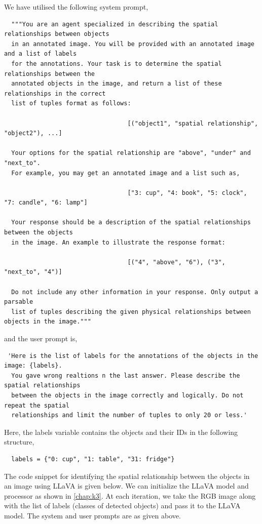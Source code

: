We have utilised the following system prompt, 
\begin{lstlisting}
  """You are an agent specialized in describing the spatial relationships between objects 
  in an annotated image. You will be provided with an annotated image and a list of labels
  for the annotations. Your task is to determine the spatial relationships between the 
  annotated objects in the image, and return a list of these relationships in the correct 
  list of tuples format as follows: 

                                  [("object1", "spatial relationship", "object2"), ...] 

  Your options for the spatial relationship are "above", "under" and "next_to". 
  For example, you may get an annotated image and a list such as, 

                                  ["3: cup", "4: book", "5: clock", "7: candle", "6: lamp"]

  Your response should be a description of the spatial relationships between the objects
  in the image. An example to illustrate the response format: 

                                  [("4", "above", "6"), ("3", "next_to", "4")]

  Do not include any other information in your response. Only output a parsable 
  list of tuples describing the given physical relationships between objects in the image."""
\end{lstlisting}
 and the user prompt is, 
 \begin{lstlisting}
 'Here is the list of labels for the annotations of the objects in the image: {labels}. 
  You gave wrong realtions n the last answer. Please describe the spatial relationships 
  between the objects in the image correctly and logically. Do not repeat the spatial 
  relationships and limit the number of tuples to only 20 or less.'
\end{lstlisting}
Here, the labels variable contains the objects and their IDs in the following structure, 
\begin{lstlisting}
  labels = {"0: cup", "1: table", "31: fridge"}
\end{lstlisting}
The code snippet for identifying the spatial relationship between the objects in an image using LLaVA is given below. 
We can initialize the LLaVA model and processor as shown in \cref{chap:k3}. At each iteration, we take the RGB image along with 
the list of labels (classes of detected objects) and pass it to the LLaVA model. The system and user prompts are as given above.
